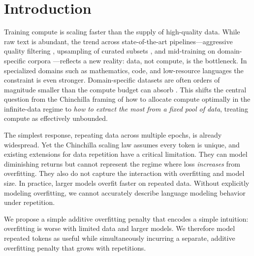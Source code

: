 \section{Introduction}

Training compute is scaling faster than the supply of high-quality data. While raw text is abundant, the trend across state-of-the-art pipelines---aggressive quality filtering \citep{penedo2024fineweb}, upsampling of curated subsets \citep{olmo2025olmo}, and mid-training on domain-specific corpora \citep{allal2025smollm, olmo2025olmo}---reflects a new reality: data, not compute, is the bottleneck. In specialized domains such as mathematics, code, and low-resource languages the constraint is even stronger. Domain-specific datasets  are often orders of magnitude smaller than the compute budget can absorb \citep{lewkowycz2022solving}. This shifts the central question from the Chinchilla framing of how to allocate compute optimally in the infinite-data regime \citep{hoffmann2022training} to \emph{how to extract the most from a fixed pool of data}, treating compute as effectively unbounded.

The simplest response, repeating data across multiple epochs, is already widespread. Yet the Chinchilla scaling law assumes every token is unique, and existing extensions \citep{muennighoff2023scaling}  for data repetition have a critical limitation. They can model diminishing returns but cannot represent the regime where loss \emph{increases} from overfitting. They also do not capture the interaction with overfitting and model size. In practice, larger models overfit faster on repeated data. Without explicitly modeling overfitting, we cannot accurately describe language modeling behavior under repetition.

We propose a simple additive overfitting penalty that encodes a simple intuition: overfitting is worse with limited data and larger models. We therefore model repeated tokens as useful while simultaneously incurring a separate, additive overfitting penalty that grows with repetitions.

